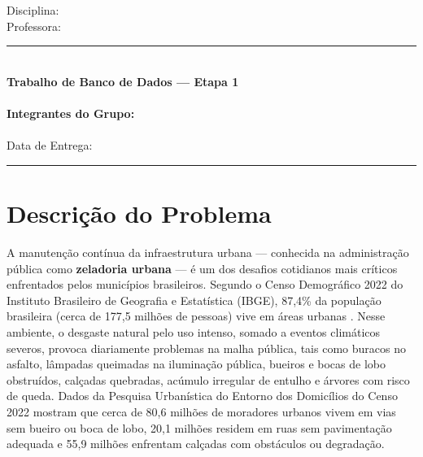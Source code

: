 \documentclass[12pt,a4paper]{article}
\begin{document}
\begin{center}
  {\large\textbf{\instituicaoNome}}\\[2pt]
  {\large\textbf{\institutoNome}}\\[2pt]
  {\normalsize Disciplina: \disciplinaNome}\\[2pt]
  {\normalsize Professora: \professorNome}\\[8pt]
  \rule{\textwidth}{0.6pt}\\[10pt]
  {\Large\textbf{Trabalho de Banco de Dados --- Etapa 1}}\\[4pt]
  {\large\textbf{\tituloTrabalho}}\\[8pt]
  {\normalsize\textbf{Integrantes do Grupo:}}\\[3pt]
  {\normalsize \integrantes}\\[5pt]
  {\small Data de Entrega: \dataEntrega}
  \\[5pt]
  \rule{\textwidth}{0.6pt}
\end{center}

\vspace{0.1cm}

\section{Descrição do Problema}

A manutenção contínua da infraestrutura urbana --- conhecida na administração pública como \textbf{zeladoria urbana} --- é um dos desafios cotidianos mais críticos enfrentados pelos municípios brasileiros. Segundo o Censo Demográfico 2022 do Instituto Brasileiro de Geografia e Estatística (IBGE), 87,4\% da população brasileira (cerca de 177,5 milhões de pessoas) vive em áreas urbanas \cite{ibge2025entorno}. Nesse ambiente, o desgaste natural pelo uso intenso, somado a eventos climáticos severos, provoca diariamente problemas na malha pública, tais como buracos no asfalto, lâmpadas queimadas na iluminação pública, bueiros e bocas de lobo obstruídos, calçadas quebradas, acúmulo irregular de entulho e árvores com risco de queda. Dados da Pesquisa Urbanística do Entorno dos Domicílios do Censo 2022 \cite{ibge2025entorno} mostram que cerca de 80,6 milhões de moradores urbanos vivem em vias sem bueiro ou boca de lobo, 20,1 milhões residem em ruas sem pavimentação adequada e 55,9 milhões enfrentam calçadas com obstáculos ou degradação.
\end{document}
